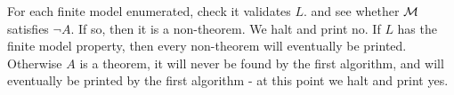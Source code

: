 \documentclass[a4paper, draft, 12pt]{article}
\begin{document}
\begin{enumerate}
\begin{enumerate}
\begin{enumerate}
  For each finite model enumerated, check it validates $L$.
  and see whether $\mathcal{M}$ satisfies $\neg A$. If so, then it is a non-theorem. 
  We halt and print no. If $L$ has the finite model property, 
  then every non-theorem will eventually be printed. Otherwise $A$ 
  is a theorem, it will never be found by the first algorithm,
  and will eventually be printed by the first algorithm - at this point 
  we halt and print yes.
  \end{enumerate} 


\end{enumerate}
\end{enumerate}
\end{document}
